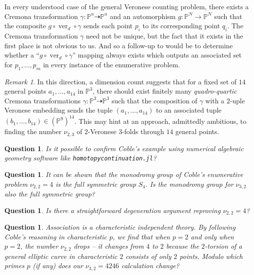 \documentclass[reqno, 11pt]{amsart}
\theoremstyle{plain}
\newtheorem{question}[theorem]{Question}
\theoremstyle{remark}
\newtheorem{remark}[theorem]{Remark}
\renewcommand{\P}{\mathbb{P}}
\DeclareMathOperator{\ver}{ver}
\begin{document}
In every understood case of the general Veronese counting problem, there exists a Cremona transformation $\gamma: \P^{n} \dashrightarrow \P^{n}$ and an automorphism $g: \P^{N} \to \P^{N}$ such that the composite $g \circ \ver_{d} \circ \gamma$ sends each point $p_{i}$ to its corresponding point $q_{i}$. The Cremona transformation $\gamma$ need not be unique, but the fact that it exists in the first place is not obvious to us.  And so a follow-up to  would be to determine whether a ``$g \circ \ver_{d} \circ \gamma$'' mapping always exists which outputs an associated set for $p_1, \dots, p_m$ in every instance of the enumerative problem.

\begin{remark}
    In this direction, a dimension count suggests that for a fixed set of $14$ general points $a_1, \dots, a_{14}$ in $\P^{3}$, there should exist finitely many \emph{quadro-quartic} Cremona transformations $\gamma: \P^{3} \dashrightarrow \P^{3}$ such that the composition of $\gamma$ with a $2$-uple Veronese embedding sends the tuple $(a_{1}, \dots, a_{14})$ to an associated tuple $(b_{1}, \dots, b_{14}) \in (\P^{9})^{14}$.  This may hint at an approach, admittedly ambitious, to finding the number $\nu_{2,3}$ of $2$-Veronese $3$-folds through $14$ general points.
\end{remark}   

\begin{question}
    \label{question:numerical}
    Is it possible to confirm Coble's example using numerical algebraic geometry software like \texttt{homotopycontinuation.jl}?
\end{question}

\begin{question}
    \label{question:monodromy} It can be shown that the monodromy group of Coble's enumerative problem $\nu_{2,2}=4$ is the full symmetric group $S_{4}$.  Is the monodromy group for $\nu_{3,2}$ also the full symmetric group?
\end{question}

\begin{question}
    \label{question:degeneration} Is there a straightforward degeneration argument reproving $\nu_{2,2}=4$?
\end{question}

\begin{question}
    \label{question:charp} Association is a characteristic independent theory.  By following Coble's reasoning in characteristic $p$, we find that when $p=2$ and only when $p=2$, the number $\nu_{2,2}$ drops -- it changes from $4$ to $2$ because the $2$-torsion of a general elliptic curve in characteristic $2$ consists of only $2$ points.  Modulo which primes $p$ (if any) does our $\nu_{3,2}= 4246$ calculation change?
\end{question}
\end{document}
